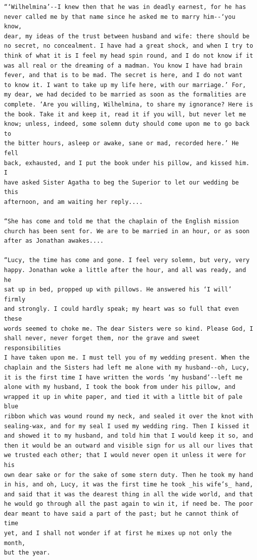 \documentclass{article}
\begin{document}
\begin{verbatim}
“‘Wilhelmina’--I knew then that he was in deadly earnest, for he has
never called me by that name since he asked me to marry him--‘you know,
dear, my ideas of the trust between husband and wife: there should be
no secret, no concealment. I have had a great shock, and when I try to
think of what it is I feel my head spin round, and I do not know if it
was all real or the dreaming of a madman. You know I have had brain
fever, and that is to be mad. The secret is here, and I do not want
to know it. I want to take up my life here, with our marriage.’ For,
my dear, we had decided to be married as soon as the formalities are
complete. ‘Are you willing, Wilhelmina, to share my ignorance? Here is
the book. Take it and keep it, read it if you will, but never let me
know; unless, indeed, some solemn duty should come upon me to go back to
the bitter hours, asleep or awake, sane or mad, recorded here.’ He fell
back, exhausted, and I put the book under his pillow, and kissed him. I
have asked Sister Agatha to beg the Superior to let our wedding be this
afternoon, and am waiting her reply....

“She has come and told me that the chaplain of the English mission
church has been sent for. We are to be married in an hour, or as soon
after as Jonathan awakes....

“Lucy, the time has come and gone. I feel very solemn, but very, very
happy. Jonathan woke a little after the hour, and all was ready, and he
sat up in bed, propped up with pillows. He answered his ‘I will’ firmly
and strongly. I could hardly speak; my heart was so full that even these
words seemed to choke me. The dear Sisters were so kind. Please God, I
shall never, never forget them, nor the grave and sweet responsibilities
I have taken upon me. I must tell you of my wedding present. When the
chaplain and the Sisters had left me alone with my husband--oh, Lucy,
it is the first time I have written the words ‘my husband’--left me
alone with my husband, I took the book from under his pillow, and
wrapped it up in white paper, and tied it with a little bit of pale blue
ribbon which was wound round my neck, and sealed it over the knot with
sealing-wax, and for my seal I used my wedding ring. Then I kissed it
and showed it to my husband, and told him that I would keep it so, and
then it would be an outward and visible sign for us all our lives that
we trusted each other; that I would never open it unless it were for his
own dear sake or for the sake of some stern duty. Then he took my hand
in his, and oh, Lucy, it was the first time he took _his wife’s_ hand,
and said that it was the dearest thing in all the wide world, and that
he would go through all the past again to win it, if need be. The poor
dear meant to have said a part of the past; but he cannot think of time
yet, and I shall not wonder if at first he mixes up not only the month,
but the year.


\end{verbatim}
\end{document}
